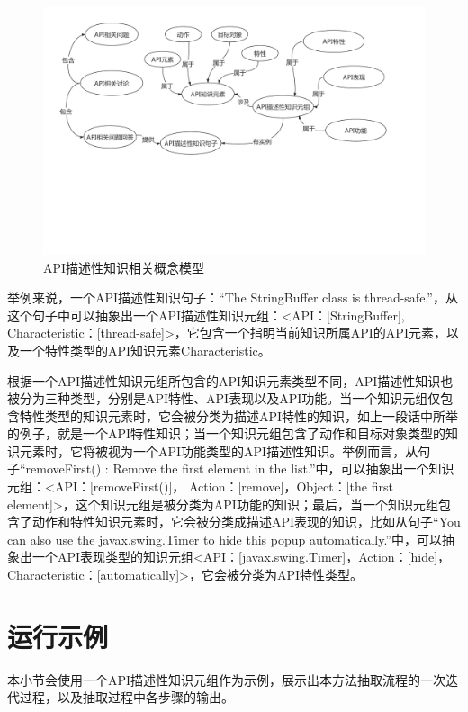 \begin{figure}[htb]
    \centering
    \includegraphics[width=\textwidth]{image/structure.pdf}
    \caption{API描述性知识相关概念模型} 
    \label{图3-2} 
\end{figure}

举例来说，一个API描述性知识句子：“The StringBuffer class is thread-safe.”，从这个句子中可以抽象出一个API描述性知识元组：<API：[StringBuffer], Characteristic：[thread-safe]>，它包含一个指明当前知识所属API的API元素，以及一个特性类型的API知识元素Characteristic。

根据一个API描述性知识元组所包含的API知识元素类型不同，API描述性知识也被分为三种类型，分别是API特性、API表现以及API功能。当一个知识元组仅包含特性类型的知识元素时，它会被分类为描述API特性的知识，如上一段话中所举的例子，就是一个API特性知识；当一个知识元组包含了动作和目标对象类型的知识元素时，它将被视为一个API功能类型的API描述性知识。举例而言，从句子“removeFirst() : Remove the first element in the list.”中，可以抽象出一个知识元组：<API：[removeFirst()]， Action：[remove]，Object：[the first element]>，这个知识元组是被分类为API功能的知识；最后，当一个知识元组包含了动作和特性知识元素时，它会被分类成描述API表现的知识，比如从句子“You can also use the javax.swing.Timer to hide this popup automatically.”中，可以抽象出一个API表现类型的知识元组<API：[javax.swing.Timer]，Action：[hide]，Characteristic：[automatically]>，它会被分类为API特性类型。

\section{运行示例}
本小节会使用一个API描述性知识元组作为示例，展示出本方法抽取流程的一次迭代过程，以及抽取过程中各步骤的输出。


